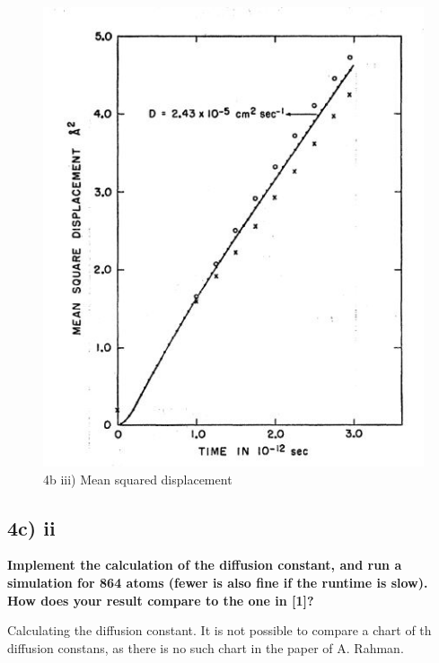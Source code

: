 \documentclass[a4paper,10pt,english]{article}
\begin{document}
\begin{figure}[h!]
        \centering 
        \includegraphics[scale=0.6]{./py/img/3Rahman.jpg} 
        \caption{4b iii) Mean squared displacement }
        \label{fig:4bv}
\end{figure}

\newpage
\subsection{4c) ii}
\textbf{Implement the calculation of the diffusion constant, and run a simulation for 864 atoms (fewer
is also fine if the runtime is slow). How does your result compare to the one in [1]?
}

Calculating the diffusion constant. It is not possible to compare a chart of th diffusion constans, as there is no such chart in the paper of A. Rahman. 
\end{document}
